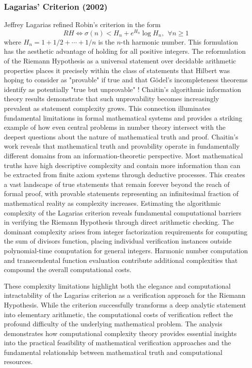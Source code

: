 \documentclass{article}
\begin{document}
\subsubsection{Lagarias' Criterion (2002)} Jeffrey Lagarias refined Robin's criterion in the form
$$RH\iff \sigma(n) < H_n + e^{H_n} \log H_n, \  \ \forall n \geq 1$$
 where $H_n = 1 + 1/2 + \cdots + 1/n$ is the $n$-th harmonic number. This formulation has the aesthetic advantage of holding for all positive integers.\newline
 The reformulation of the Riemann Hypothesis as a universal statement over decidable arithmetic properties places it precisely within the class of statements that Hilbert was hoping to consider as "provable" if true and that Gödel's incompleteness theorems identify as potentially "true but unprovable" ! Chaitin's algorithmic information theory results demonstrate that such unprovability becomes increasingly prevalent as statement complexity grows. This connection illuminates fundamental limitations in formal mathematical systems and provides a striking example of how even central problems in number theory intersect with the deepest questions about the nature of mathematical truth and proof.
   Chaitin's work reveals that mathematical truth and provability operate in fundamentally different domains from an information-theoretic perspective. Most mathematical truths have high descriptive complexity and contain more information than can be extracted from finite axiom systems through deductive processes. This creates a vast landscape of true statements that remain forever beyond the reach of formal proof, with provable statements representing an infinitesimal fraction of mathematical reality as complexity increases. 
Estimating the algorithmic complexity of the Lagarias criterion reveals fundamental computational barriers in verifying the Riemann Hypothesis through direct arithmetic checking. The dominant complexity arises from integer factorization requirements for computing the sum of divisors function, placing individual verification instances outside polynomial-time computation for general integers. Harmonic number computation and transcendental function evaluation contribute additional complexities that compound the overall computational costs.

These complexity limitations highlight both the elegance and computational intractability of the Lagarias criterion as a verification approach for the Riemann Hypothesis. While the criterion successfully transforms a deep analytic statement into elementary arithmetic, the computational costs of verification reflect the profound difficulty of the underlying mathematical problem. The analysis demonstrates how computational complexity theory provides essential insights into the practical feasibility of mathematical verification approaches and the fundamental relationship between mathematical truth and computational resources.
\end{document}
